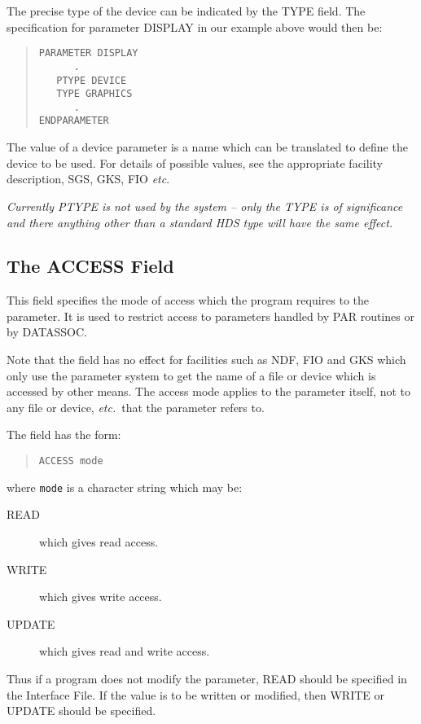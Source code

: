 \documentclass[twoside,11pt]{article}
\newcommand{\xlabel}[1]{}
\renewcommand{\_}{\texttt{\symbol{95}}}
\begin{document}
The precise type of the device can be indicated by the TYPE field.
The specification for parameter DISPLAY in our example above would then be:
\begin{quote} \begin{verbatim}
PARAMETER DISPLAY
      .
   PTYPE DEVICE
   TYPE GRAPHICS
      .
ENDPARAMETER
\end{verbatim} \end{quote}
The value of a device parameter is
a name which can be translated to define the device to be used.
For details of possible values, see the appropriate facility description,
SGS, GKS, FIO {\em etc}.

{\em
Currently PTYPE is not used by the system -- only the TYPE is of significance
and there anything other than a standard HDS type will have the same effect.}

\subsection{The ACCESS Field\xlabel{the_access_field}}

This field specifies the mode of access which the program
requires to the parameter.
It is used to restrict access to parameters handled by PAR routines or by
DAT\_ASSOC.

Note that the field has no effect for facilities such as NDF, FIO and GKS
which only use the parameter system to get the name of a file or device which
is accessed by other means. The access mode applies to the parameter itself,
not to any file or device, {\em etc.}\ that the parameter refers to.

The field has the form:
\begin{quote} \begin{verbatim}
ACCESS mode
\end{verbatim} \end{quote}
where \texttt{mode} is a character string which may be:
\begin{description}
\item[READ] which gives read access.
\item[WRITE] which gives write access.
\item[UPDATE] which gives read and write access.
\end{description}

Thus if a program does not modify the parameter,
READ should be specified in the Interface File.
If the value is to be written or modified, then WRITE or UPDATE 
should be specified.
\end{document}
